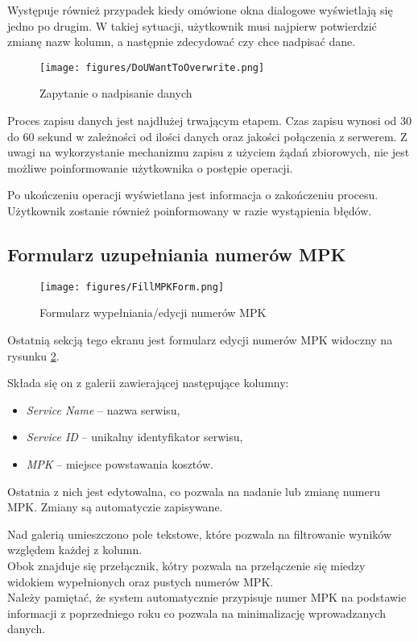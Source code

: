 Występuje również przypadek kiedy omówione okna dialogowe wyświetlają się jedno po drugim. W takiej sytuacji, użytkownik musi najpierw potwierdzić zmianę nazw kolumn, a następnie zdecydować czy chce nadpisać dane.

\begin{figure}[h]
            \centering
            \texttt{[image: figures/DoUWantToOverwrite.png]}
            \caption{Zapytanie o nadpisanie danych}
            \label{fig:DoYouWantToOverwrite}
        \end{figure}

Proces zapisu danych jest najdłużej trwającym etapem. Czas zapisu wynosi od 30 do 60 sekund w zależności od ilości danych oraz jakości połączenia z serwerem. Z uwagi na wykorzystanie mechanizmu zapisu z użyciem żądań zbiorowych, nie jest możliwe poinformowanie użytkownika o postępie operacji.

Po ukończeniu operacji wyświetlana jest informacja o zakończeniu procesu. Użytkownik zostanie również poinformowany w razie wystąpienia błędów.

\subsection{Formularz uzupełniania numerów MPK}
 \begin{figure}[h]
     \centering
     \texttt{[image: figures/FillMPKForm.png]}
     \caption{Formularz wypełniania/edycji numerów MPK}
     \label{fig:fillmpkform}
 \end{figure}

 Ostatnią sekcją tego ekranu jest formularz edycji numerów MPK widoczny na rysunku \ref{fig:fillmpkform}. 

 Składa się on z galerii zawierającej następujące kolumny:
 \begin{itemize}
    \item \emph{Service Name} -- nazwa serwisu,
    \item \emph{Service ID} -- unikalny identyfikator serwisu,
    \item \emph{MPK} -- miejsce powstawania kosztów.
 \end{itemize}
 Ostatnia z nich jest edytowalna, co pozwala na nadanie lub zmianę numeru MPK. Zmiany są automatyczie zapisywane.

 Nad galerią umieszczono pole tekstowe, które pozwala na filtrowanie wyników względem każdej z kolumn. \\Obok znajduje się przełącznik, kótry pozwala na przełączenie się miedzy widokiem wypełnionych oraz pustych numerów MPK.\\
 Należy pamiętać, że system automatycznie przypisuje numer MPK na podstawie informacji z poprzedniego roku co pozwala na minimalizację wprowadzanych danych.

